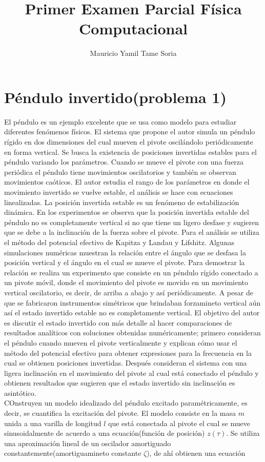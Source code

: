 \documentclass[10pt,twocolumn]{article}
\begin{document}
\title{Primer Examen Parcial F\'isica Computacional}
\author{Mauricio Yamil Tame Soria}
\maketitle

\section{P\'endulo invertido(problema 1)}
El p\'endulo es un ejemplo excelente que se usa como modelo para 
estudiar diferentes fen\'omenos f\'isicos. El sistema que propone el 
autor simula un 
p\'endulo r\'igido en dos dimensiones del cual mueven el pivote 
oscil\'andolo peri\'odicamente en forma vertical. Se busca la 
existencia de posiciones invertidas estables para el p\'endulo variando 
los par\'ametros. Cuando se mueve el pivote con una fuerza peri\'odica 
el p\'endulo tiene movimientos oscilatorios y tambi\'en se observan 
movimientos ca\'oticos. El autor estudia el rango de los par\'ametros en 
donde el movimiento invertido se vuelve estable, el an\'alisis se hace 
con ecuaciones linealizadas. La posici\'on invertida estable es un 
fen\'omeno de estabilizaci\'on din\'amica. En los experimentos se 
observa que la posici\'on invertida estable del p\'endulo no es 
completamente vertical si no que tiene un ligero desfase y sugieren que 
se debe a la inclinaci\'on de la fuerza sobre el pivote. Para el 
an\'alisis se utiliza el m\'etodo del potencial efectivo de Kapitza y 
Landau y Lifshitz. Algunas simulaciones num\'ericas muestran la 
relaci\'on entre el \'angulo que se desfasa la posici\'on vertical y el 
\'angulo en el cual se mueve el pivote. Para demostrar la relaci\'on se 
realiza un experimento que consiste en un p\'endulo r\'igido conectado a 
un pivote m\'ovil, donde el movimiento del pivote es movido en un 
movimiento vertical oscilatorio, es decir, de arriba a abajo y as\'i 
peri\'odicamente. A pesar de que se fabricaron instrumentos sim\'etricos 
que brindaban forzamineto vertical a\'un as\'i el estado invertido 
estable no es completamente vertical. El objetivo del autor es discutir 
el estado invertido con m\'as detalle al hacer comparaciones de 
resultados anal\'iticos con soluciones obtenidas num\'ericamente; 
primero consideran el p\'endulo cuando mueven el pivote verticalmente y 
explican c\'omo usar el m\'etodo del potencial efectivo para obtener 
expresiones para la frecuencia en la cual se obtienen posiciones 
invertidas. Despu\'es consideran el sistema con una ligera inclinaci\'on 
en el movimiento del pivote al cual est\'a conectado el p\'endulo y 
obtienen resultados que sugieren que el estado invertido sin 
inclinaci\'on es asint\'otico. \\ \newline
COnstruyen un modelo idealizado del p\'endulo excitado 
param\'etricamente, es decir, se cuantifica la excitaci\'on del pivote. 
El modelo consiste en la masa $m$ unida a una varilla de longitud $l$ 
que est\'a conectada al pivote el cual se mueve sinusoidalmente de 
acuerdo a una ecuaci\'on(funci\'on de posici\'on) $z(\tau)$. Se utiliza 
una 
aproximaci\'on 
lineal de un oscilador amortiguado constantemente(amortiguamineto 
constante $\zeta$), de ah\'i 
obtienen una 
ecuaci\'on
\end{document}
